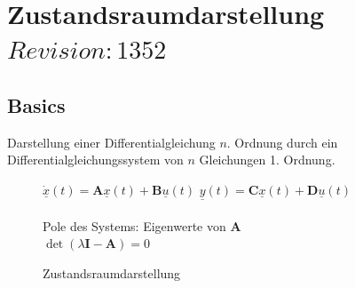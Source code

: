\section{Zustandsraumdarstellung \tiny{$Revision: 1352 $}}
\scriptsize
\label{sec:ZRD}

\subsection{Basics}
Darstellung einer Differentialgleichung $n$. Ordnung durch ein
Differentialgleichungssystem von $n$ Gleichungen 1. Ordnung.


\begin{figure}[!h]
	\normalsize
	\begin{minipage}{.45\linewidth}
		\centering
		\normalsize
	\end{minipage}%
	\hfill
	\begin{minipage}{.45\linewidth}
		$\dot{\underline{x}}(t) = {\boldsymbol A} \underline{x}(t) + {\boldsymbol B}
		\underline{u}(t)$\newline
		$\underline{y}(t) = {\boldsymbol C} \underline{x}(t) + {\boldsymbol D}
		\underline{u}(t)$\\ \\
		Pole des Systems: Eigenwerte von $\boldsymbol{A}$\\
		$\det\left(\lambda \boldsymbol{I}- \boldsymbol{A}\right) =0$
	\end{minipage}
	\caption{Zustandsraumdarstellung}
	\label{fig:ZRD}
\end{figure}



